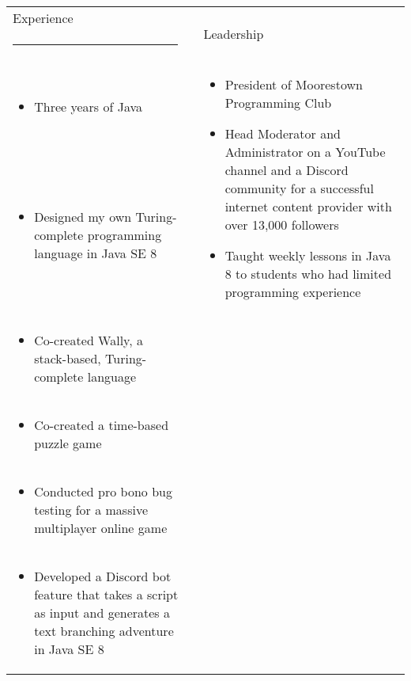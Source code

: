\begin{tabular}{p{4.42in}cp{2.8in}}
	{\fontfamily{lmdh}\fontsize{24}{28.8}\selectfont Experience} && \multirow{2}{*}{
			{\fontfamily{lmdh}\fontsize{24}{28.8}\selectfont Leadership}
		}\\
	\rule{175pt}{2pt} && \multirow{2}{*}{\rule{175pt}{2pt}}\\
	\vspace{-10pt}
	\raggedright
	
	\begin{itemize}
		\item Three years of Java
	\end{itemize} &\multirow{2}{*}{\rule{.5pt}{200pt}}
		& \multirow{2}{2.8in}{
			\flushleft
			\begin{itemize}
				\item President of Moorestown Programming Club
				\item Head Moderator and Administrator on a YouTube channel and a Discord community for a successful internet content provider with over 13,000 followers
				\item Taught weekly lessons in Java 8 to students who had limited programming experience 
			\end{itemize}
		}\\
	\vspace{-30pt}
	\raggedright
	\begin{itemize}
		\item Designed my own Turing-complete programming language in Java SE 8
	\end{itemize} && \\
	\vspace{-30pt}
	\raggedright
	\begin{itemize}
		\item Co-created Wally, a stack-based, Turing-complete language
	\end{itemize} && \\
	\vspace{-30pt}
	\raggedright
	\begin{itemize}
		\item Co-created a time-based puzzle game
	\end{itemize} && \\
		
	\vspace{-30pt}
	\raggedright
	\begin{itemize}
		\item Conducted pro bono bug testing for a massive multiplayer online game
	\end{itemize} && \\
	\vspace{-30pt}
	\raggedright
	\begin{itemize}
		\item Developed a Discord bot feature that takes a script as input and generates a text branching adventure in Java SE 8
	\end{itemize} && \\
\end{tabular}\\